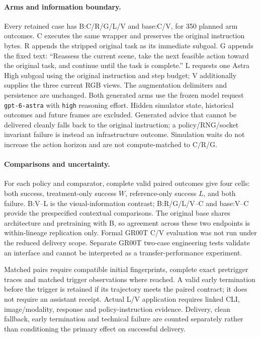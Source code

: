 \paragraph{Arms and information boundary.}
Every retained case has B:C/R/G/L/V and base:C/V, for 350 planned arm outcomes. C executes the same wrapper and preserves the original instruction bytes. R appends the stripped original task as its immediate subgoal. G appends the fixed text: ``Reassess the current scene, take the next feasible action toward the original task, and continue until the task is complete.'' L requests one Astra High subgoal using the original instruction and step budget; V additionally supplies the three current RGB views. The augmentation delimiters and persistence are unchanged. Both generated arms use the frozen model request \texttt{gpt-6-astra} with \texttt{high} reasoning effort. Hidden simulator state, historical outcomes and future frames are excluded. Generated advice that cannot be delivered cleanly falls back to the original instruction; a policy/RNG/socket invariant failure is instead an infrastructure outcome. Simulation waits do not increase the action horizon and are not compute-matched to C/R/G.

\paragraph{Comparisons and uncertainty.}
For each policy and comparator, complete valid paired outcomes give four cells: both success, treatment-only success $W$, reference-only success $L$, and both failure. B:V--L is the visual-information contrast; B:R/G/L/V--C and base:V--C provide the prespecified contextual comparisons. The original base shares architecture and pretraining with B, so agreement across these two endpoints is within-lineage replication only. Formal GR00T C/V evaluation was not run under the reduced delivery scope. Separate GR00T two-case engineering tests validate an interface and cannot be interpreted as a transfer-performance experiment.

Matched pairs require compatible initial fingerprints, complete exact pretrigger traces and matched trigger observations where reached. A valid early termination before the trigger is retained if its trajectory meets the paired contract; it does not require an assistant receipt. Actual L/V application requires linked CLI, image/modality, response and policy-instruction evidence. Delivery, clean fallback, early termination and technical failure are counted separately rather than conditioning the primary effect on successful delivery.

